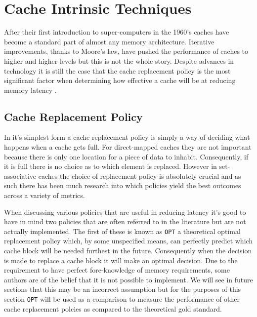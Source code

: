 \section{Cache Intrinsic Techniques}

\label{sec:cache}

After their first introduction to super-computers in the 1960's \cite{pattersonComputerOrganizationDesign2018} caches have become a standard part of almost any memory architecture. Iterative improvements, thanks to Moore's law, have pushed the performance of caches to higher and higher levels but this is not the whole story. Despite advances in technology it is still the case that the cache replacement policy is the most significant factor when determining how effective a cache will be at reducing memory latency \cite{hennessyComputerArchitectureQuantitative2019}.

\subsection{Cache Replacement Policy}
\label{sec:replacement_policy}

In it's simplest form a cache replacement policy is simply a way of deciding what happens when a cache gets full. For direct-mapped caches they are not important because there is only one location for a piece of data to inhabit. Consequently, if it is full there is no choice as to which element is replaced. However in set-associative caches the choice of replacement policy is absolutely crucial \cite{hennessyComputerArchitectureQuantitative2019} and as such there has been much research into which policies yield the best outcomes across a variety of metrics.

When discussing various policies that are useful in reducing latency it's good to have in mind two policies that are often referred to in the literature but are not actually implemented. The first of these is known as \texttt{OPT} \cite{jeongOptimalReplacementsCaches1999} a theoretical optimal replacement policy which, by some unspecified means, can perfectly predict which cache block will be needed furthest in the future. Consequently when the decision is made to replace a cache block it will make an optimal decision. Due to the requirement to have perfect fore-knowledge of memory requirements, some authors \cite{jeongOptimalReplacementsCaches1999, pandaSurveyReplacementStrategies2016} are of the belief that it is not possible to implement. We will see in future sections that this may be an incorrect assumption but for the purposes of this section \texttt{OPT} will be used as a comparison to measure the performance of other cache replacement polcies as compared to the theoretical gold standard.

